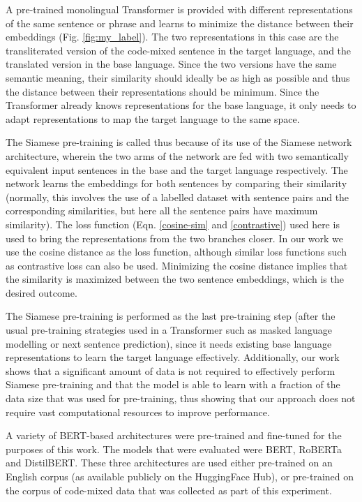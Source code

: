 \documentclass[conference]{IEEEtran}
\begin{document}
A pre-trained monolingual Transformer is provided with different representations of the same sentence or phrase and learns to minimize the distance between their embeddings (Fig. \ref{fig:my_label}). The two representations in this case are the transliterated version of the code-mixed sentence in the target language, and the translated version in the base language. Since the two versions have the same semantic meaning, their similarity should ideally be as high as possible and thus the distance between their representations should be minimum. Since the Transformer already knows representations for the base language, it only needs to adapt representations to map the target language to the same space. 

The Siamese pre-training is called thus because of its use of the Siamese network architecture, wherein the two arms of the network are fed with two semantically equivalent input sentences in the base and the target language respectively. The network learns the embeddings for both sentences by comparing their similarity (normally, this involves the use of a labelled dataset with sentence pairs and the corresponding similarities, but here all the sentence pairs have maximum similarity). The loss function (Eqn. \ref{cosine-sim} and \ref{contrastive}) used here is used to bring the representations from the two branches closer. In our work we use the cosine distance as the loss function, although similar loss functions such as contrastive loss can also be used. Minimizing the cosine distance implies that the similarity is maximized between the two sentence embeddings, which is the desired outcome. 

The Siamese pre-training is performed as the last pre-training step (after the usual pre-training strategies used in a Transformer such as masked language modelling or next sentence prediction), since it needs existing base language representations to learn the target language effectively. Additionally, our work shows that a significant amount of data is not required to effectively perform Siamese pre-training and that the model is able to learn with a fraction of the data size that was used for pre-training, thus showing that our approach does not require vast computational resources to improve performance.

A variety of BERT-based architectures were pre-trained and fine-tuned for the purposes of this work. The models that were evaluated were BERT, RoBERTa and DistilBERT. These three architectures are used either pre-trained on an English corpus (as available publicly on the HuggingFace Hub), or pre-trained on the corpus of code-mixed data that was collected as part of this experiment.
\end{document}
